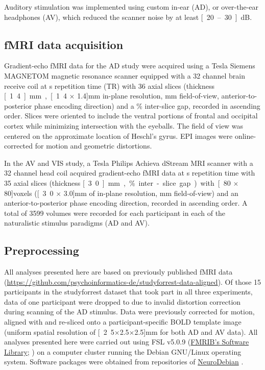 \documentclass[english]{article}
\begin{document}
Auditory stimulation was implemented using custom in-ear (AD), or over-the-ear
headphones (AV), which reduced the scanner noise by
at least \unit[20–30]{dB}.


\subsection{fMRI data acquisition}

Gradient-echo fMRI data for the AD study were acquired using a \unit[7]{Tesla}
Siemens MAGNETOM magnetic resonance scanner equipped with a 32 channel brain
receive coil at \unit[2]{s} repetition time (TR) with 36 axial slices (thickness
\unit[1.4]{mm}, \unit[1.4 $\times$ 1.4]{mm} in-plane resolution, \unit[224]{mm}
field-of-view, anterior-to-posterior phase encoding direction) and a
\unit[10]{\%} inter-slice gap, recorded in ascending order.
Slices were oriented to include the ventral portions of frontal and occipital
cortex while minimizing intersection with the eyeballs.
The field of view was centered on the approximate location of Heschl's gyrus.
EPI images were online-corrected for motion and geometric distortions.

In the AV and VIS study, a \unit[3]{Tesla} Philips Achieva dStream
MRI scanner with a 32 channel head coil acquired gradient-echo fMRI data
at \unit[2]{s} repetition time with
35 axial slices (thickness \unit[3.0]{mm}, \unit[10]{\%} inter-slice gap) with
\unit[80 $\times$ 80]{voxels} (\unit[3.0 $\times$ 3.0]{mm} of in-plane
resolution, \unit[240]{mm} field-of-view) and an anterior-to-posterior phase
encoding direction, recorded in ascending order.
A total of 3599 volumes were recorded for each participant in each of the
naturalistic stimulus paradigms (AD and AV).

\subsection{Preprocessing}

All analyses presented here are based on previously published fMRI data
(\url{https://github.com/psychoinformatics-de/studyforrest-data-aligned}).
Of those 15 participants in the studyforrest dataset that took
part in all three experiments,
data of one participant were dropped to due to invalid distortion correction
during scanning of the AD stimulus.
Data were previously corrected for motion, aligned with and re-sliced onto a
participant-specific BOLD template image \citep{sengupta2016extension}
(uniform spatial resolution of \unit[2.5$\times$2.5$\times$2.5]{mm} for both
AD and AV data).
All analyses presented here were carried out using
FSL v5.0.9 (\href{https://www.fmrib.ox.ac.uk/fsl}{FMRIB's Software Library};
\citep{smith2004fsl}) on a computer cluster running the Debian GNU/Linux
operating system. Software packages were obtained from repositories of
\href{http://neuro.debian.net}{NeuroDebian} \citep{halchenko2012open}.
\end{document}
